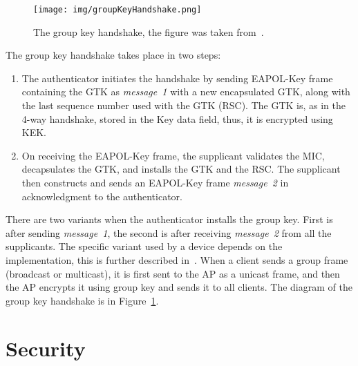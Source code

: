 \begin{figure}[h!]
  \centering
  \texttt{[image: img/groupKeyHandshake.png]}
  \caption[The group key handshake]{The group key handshake, the figure was taken from~\cite{ieee802.11i_2004}.}
  \label{fig: group_key_handshake}
\end{figure}

The group key handshake takes place in two steps:
\begin{enumerate}
    \item The authenticator initiates the handshake by sending EAPOL-Key frame containing the GTK as \textit{message~1} with a new encapsulated GTK, along with the last sequence number used with the GTK (RSC). The GTK is, as in the 4-way handshake, stored in the Key data field, thus, it is encrypted using KEK.
    \item  On receiving the EAPOL-Key frame, the supplicant validates the MIC, decapsulates the GTK, and installs the GTK and the RSC. The supplicant then constructs and sends an EAPOL-Key frame \textit{message~2} in acknowledgment to the authenticator.
\end{enumerate}

There are two variants when the authenticator installs the group key. First is after sending \textit{message~1}, the second is after receiving \textit{message~2} from all the supplicants. The specific variant used by a device depends on the implementation, this is further described in~\cite{VA_ccs2017}.
When a client sends a group frame (broadcast or multicast), it is first sent to the AP as a unicast frame, and then the AP encrypts it using group key and sends it to all clients. The diagram of the group key handshake is in Figure~\ref{fig: group_key_handshake}.

\section{Security}
\label{sec:security}

